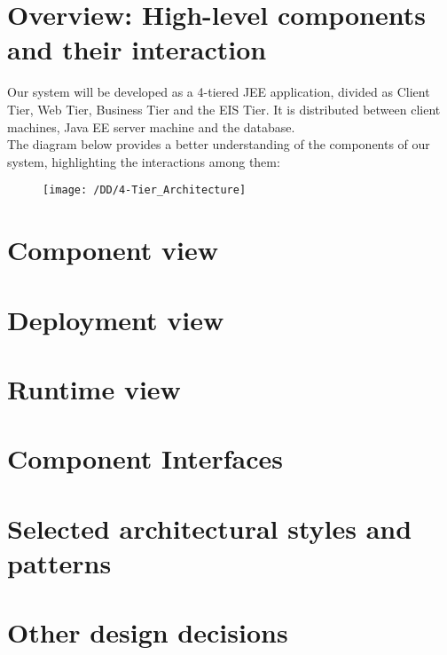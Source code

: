 \section{Overview: High-level components and their interaction}
	Our system will be developed as a 4-tiered JEE application, divided as Client Tier, Web Tier, Business Tier and the EIS Tier. It is distributed between client machines, Java EE server machine and the database.
	\\The diagram below provides a better understanding of the components of our system, highlighting the interactions among them:
	\begin{figure}[!ht]
	  \centering
	  \vspace{0.2cm}
	  \texttt{[image: /DD/4-Tier\_Architecture]}\\
	  \vspace{0.4cm}
	  \label{fig:4-Tier_Architecture} 
	\end{figure}
\section{Component view}
	\blindtext
\section{Deployment view}
	\blindtext
\section{Runtime view}
	\blindtext
\section{Component Interfaces}
	\blindtext
\section{Selected architectural styles and patterns}
	\blindtext
\section{Other design decisions}
	\blindtext